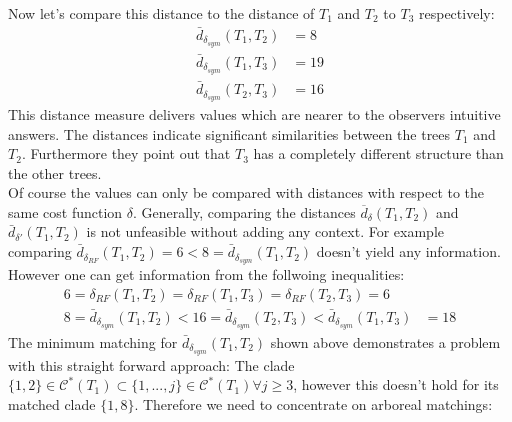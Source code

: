 Now let's compare this distance to the distance of $T_1$ and $T_2$ to $T_3$ respectively:
\begin{align*}
\bar{d}_{\delta_{sym}}(T_1, T_2) &= 8\\
\bar{d}_{\delta_{sym}}(T_1, T_3) &= 19\\
\bar{d}_{\delta_{sym}}(T_2, T_3) &= 16
\end{align*}
This distance measure delivers values which are nearer to the observers intuitive answers. The distances indicate significant similarities between the trees $T_1$ and $T_2$. Furthermore they point out that $T_3$ has a completely different structure than the other trees.\\
Of course the values can only be compared with distances with respect to the same cost function $\delta$. Generally, comparing the distances $\overline{d}_{\delta}(T_1,T_2)$ and $\bar{d}_{\delta'}(T_1,T_2)$ is not unfeasible without adding any context. For example comparing $\bar{d}_{\delta_{RF}}(T_1,T_2) = 6 < 8 = \bar{d}_{\delta_{sym}}(T_1, T_2)$ doesn't yield any information. However one can get information from the follwoing inequalities:
\begin{align*}
6 = \delta_{RF}(T_1,T_2) = \delta_{RF}(T_1,T_3) =\delta_{RF}(T_2,T_3) = 6 \\
8 = \bar{d}_{\delta_{sym}}(T_1, T_2) < 16 = \bar{d}_{\delta_{sym}}(T_2, T_3) < \bar{d}_{\delta_{sym}}(T_1, T_3) &= 18
\end{align*}
The minimum matching for $\bar{d}_{\delta_{sym}}(T_1, T_2)$ shown above demonstrates a problem with this straight forward approach: The clade $\{1,2\} \in \mathcal{C}^*(T_1) \subset \{1,...,j\} \in \mathcal{C}^*(T_1) \forall j \geq 3$, however this doesn't hold for its matched clade $\{1,8\}$. Therefore we need to concentrate on arboreal matchings:

